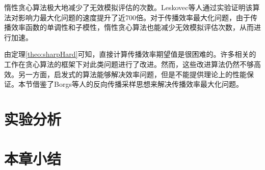 惰性贪心算法极大地减少了无效模拟评估的次数。Leskovec等人通过实验证明该算法对影响力最大化问题的速度提升了近700倍。对于传播效率最大化问题，由于传播效率函数的单调性和子模性，惰性贪心算法也能减少无效模拟评估次数，从而进行加速。

由定理\ref{theo:sharpHard}可知，直接计算传播效率期望值是很困难的。许多相关的工作在贪心算法的框架下对此类问题进行了改进。然而，这些改进算法仍然不够高效。另一方面，启发式的算法能够解决效率问题，但是不能提供理论上的性能保证。本节借鉴了Borgs等人的反向传播采样思想来解决传播效率最大化问题。

\section{实验分析}
\label{3sec:experiment}

\section{本章小结}
\label{3sec:conclusion}

